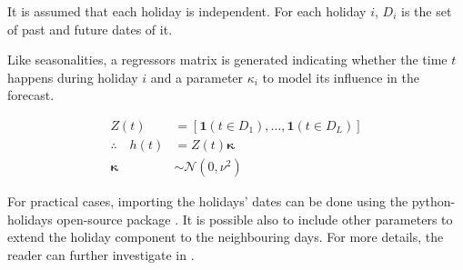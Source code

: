 It is assumed that each holiday is independent. For each holiday $i$, $D_i$ is the set of past and future dates of it. 

Like seasonalities, a regressors matrix is generated indicating whether the time $t$ happens during holiday $i$ and a parameter $\kappa_i$ to model its influence in the forecast.

\begin{align}
	Z(t) &=  \left[   \bm{1}(t \in D_1), \ldots, \bm{1}(t \in D_L) \right] \\
	\therefore \quad h(t) &= Z(t)\bm{\kappa} \\
	\bm{\kappa} &\sim \mathcal{N}(0,\nu^2)
\end{align}

For practical cases, importing the holidays' dates can be done using the python-holidays open-source package  \cite{Holidays}. It is possible also to include other parameters to extend the holiday component to the neighbouring days. For more details, the reader can further investigate in \cite{fb_prophet}.


